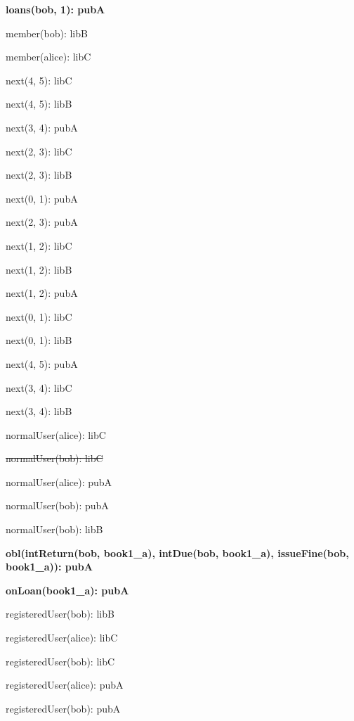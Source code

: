 \documentclass{article}
\newenvironment{states}
        {\begin{minipage}{\tableWidth}\raggedright\begin{description}[align=left,leftmargin=1em,noitemsep,labelsep=\parindent]}
        {\end{description}\end{minipage}}
\begin{document}
{\begin{states}
\item\textbf{{loans(\allowbreak{}bob, 1): pubA}}
\item{{member(\allowbreak{}bob): libB}}
\item{{member(\allowbreak{}alice): libC}}
\item{{next(\allowbreak{}4, 5): libC}}
\item{{next(\allowbreak{}4, 5): libB}}
\item{{next(\allowbreak{}3, 4): pubA}}
\item{{next(\allowbreak{}2, 3): libC}}
\item{{next(\allowbreak{}2, 3): libB}}
\item{{next(\allowbreak{}0, 1): pubA}}
\item{{next(\allowbreak{}2, 3): pubA}}
\item{{next(\allowbreak{}1, 2): libC}}
\item{{next(\allowbreak{}1, 2): libB}}
\item{{next(\allowbreak{}1, 2): pubA}}
\item{{next(\allowbreak{}0, 1): libC}}
\item{{next(\allowbreak{}0, 1): libB}}
\item{{next(\allowbreak{}4, 5): pubA}}
\item{{next(\allowbreak{}3, 4): libC}}
\item{{next(\allowbreak{}3, 4): libB}}
\item{{normalUser(\allowbreak{}alice): libC}}
\item{\sout{normalUser(\allowbreak{}bob): libC}}
\item{{normalUser(\allowbreak{}alice): pubA}}
\item{{normalUser(\allowbreak{}bob): pubA}}
\item{{normalUser(\allowbreak{}bob): libB}}
\item\textbf{{obl(\allowbreak{}intReturn(\allowbreak{}bob, book1\_a), intDue(\allowbreak{}bob, book1\_a), issueFine(\allowbreak{}bob, book1\_a)): pubA}}
\item\textbf{{onLoan(\allowbreak{}book1\_a): pubA}}
\item{{registeredUser(\allowbreak{}bob): libB}}
\item{{registeredUser(\allowbreak{}alice): libC}}
\item{{registeredUser(\allowbreak{}bob): libC}}
\item{{registeredUser(\allowbreak{}alice): pubA}}
\item{{registeredUser(\allowbreak{}bob): pubA}}
\end{states}}
\end{document}
